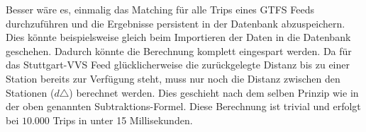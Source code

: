    \pagebreak

    Besser wäre es, einmalig das Matching für alle Trips eines GTFS Feeds durchzuführen und die Ergebnisse persistent in der Datenbank abzuspeichern. Dies könnte beispielsweise gleich beim Importieren der Daten in die Datenbank geschehen. Dadurch könnte die Berechnung komplett eingespart werden. 
    Da für das Stuttgart-VVS Feed glücklicherweise die zurückgelegte Distanz bis zu einer Station bereits zur Verfügung steht, muss nur noch die Distanz zwischen den Stationen ($d\triangle$) berechnet werden. Dies geschieht nach dem selben Prinzip wie in der oben genannten Subtraktions-Formel. Diese Berechnung ist trivial und erfolgt bei $10.000$ Trips in unter 15 Millisekunden.


